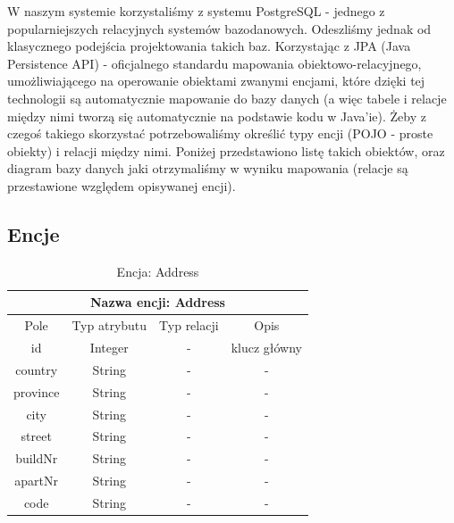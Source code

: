 \documentclass{report}
\begin{document}
	W naszym systemie korzystaliśmy z systemu PostgreSQL - jednego z popularniejszych relacyjnych systemów bazodanowych. Odeszliśmy jednak od klasycznego podejścia projektowania takich baz. Korzystając z JPA (Java Persistence API) - oficjalnego standardu mapowania obiektowo-relacyjnego, umożliwiającego na operowanie obiektami zwanymi encjami, które dzięki tej technologii są automatycznie mapowanie do bazy danych (a więc tabele i relacje między nimi tworzą się automatycznie na podstawie kodu w Java'ie). Żeby z czegoś takiego skorzystać potrzebowaliśmy określić typy encji (POJO - proste obiekty) i relacji między nimi. Poniżej przedstawiono listę takich obiektów, oraz diagram bazy danych jaki otrzymaliśmy w wyniku mapowania (relacje są przestawione względem opisywanej encji).
	
		\subsection{Encje}

			\begin{longtable}{|c|c|c|c|}
				\caption{Encja: Address} \label{POJO_1} \\ \hline
				\multicolumn{4}{|c|}{ Nazwa encji: Address} \\ \hline
				Pole & Typ atrybutu & Typ relacji & Opis \\ \hline
				id & Integer & - & klucz główny \\ \hline
				country & String & - & - \\ \hline
				province & String & - & - \\ \hline
				city & String & - & - \\ \hline
				street & String & - & - \\ \hline
				buildNr & String & - & -\\ \hline
				apartNr & String & - & - \\ \hline
				code & String & - & - \\ \hline
			\end{longtable}
\end{document}
